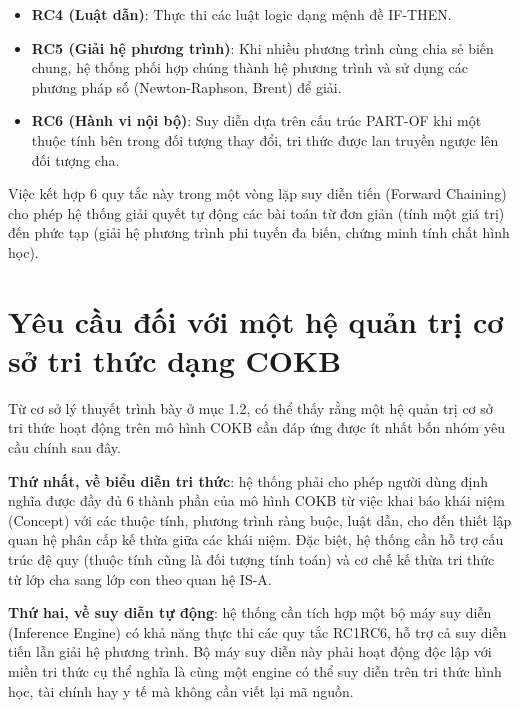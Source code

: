 \documentclass[13pt,a4paper,oneside]{extreport}
\begin{document}
\begin{itemize}
  \item \textbf{RC4 (Luật dẫn)}: Thực thi các luật logic dạng mệnh đề IF-THEN.
\end{itemize}



\begin{itemize}
  \item \textbf{RC5 (Giải hệ phương trình)}: Khi nhiều phương trình cùng chia sẻ biến chung, hệ thống phối hợp chúng thành hệ phương trình và sử dụng các phương pháp số (Newton-Raphson, Brent) để giải.
\end{itemize}



\begin{itemize}
  \item \textbf{RC6 (Hành vi nội bộ)}: Suy diễn dựa trên cấu trúc PART-OF  khi một thuộc tính bên trong đối tượng thay đổi, tri thức được lan truyền ngược lên đối tượng cha.
\end{itemize}



Việc kết hợp 6 quy tắc này trong một vòng lặp suy diễn tiến (Forward Chaining) cho phép hệ thống giải quyết tự động các bài toán từ đơn giản (tính một giá trị) đến phức tạp (giải hệ phương trình phi tuyến đa biến, chứng minh tính chất hình học).


\section{Yêu cầu đối với một hệ quản trị cơ sở tri thức dạng COKB}


Từ cơ sở lý thuyết trình bày ở mục 1.2, có thể thấy rằng một hệ quản trị cơ sở tri thức hoạt động trên mô hình COKB cần đáp ứng được ít nhất bốn nhóm yêu cầu chính sau đây.


\textbf{Thứ nhất, về biểu diễn tri thức}: hệ thống phải cho phép người dùng định nghĩa được đầy đủ 6 thành phần của mô hình COKB  từ việc khai báo khái niệm (Concept) với các thuộc tính, phương trình ràng buộc, luật dẫn, cho đến thiết lập quan hệ phân cấp kế thừa giữa các khái niệm. Đặc biệt, hệ thống cần hỗ trợ cấu trúc đệ quy (thuộc tính cũng là đối tượng tính toán) và cơ chế kế thừa tri thức từ lớp cha sang lớp con theo quan hệ IS-A.


\textbf{Thứ hai, về suy diễn tự động}: hệ thống cần tích hợp một bộ máy suy diễn (Inference Engine) có khả năng thực thi các quy tắc RC1RC6, hỗ trợ cả suy diễn tiến lẫn giải hệ phương trình. Bộ máy suy diễn này phải hoạt động độc lập với miền tri thức cụ thể  nghĩa là cùng một engine có thể suy diễn trên tri thức hình học, tài chính hay y tế mà không cần viết lại mã nguồn.
\end{document}
